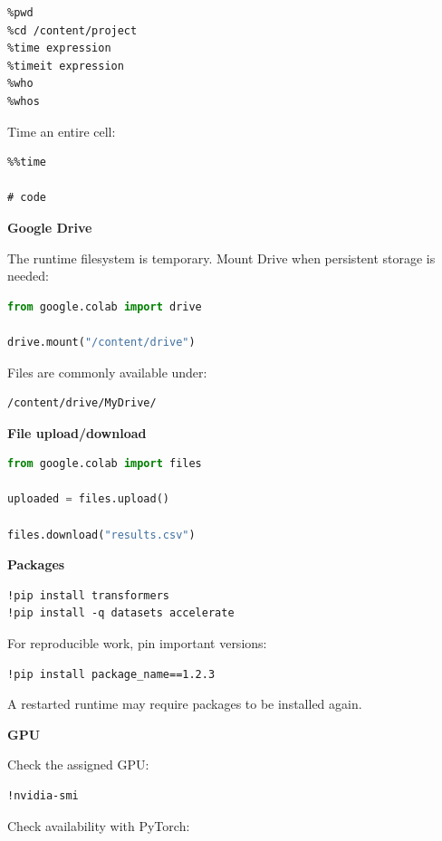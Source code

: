 \documentclass[11pt,letterpaper]{article}
\begin{document}
\begin{lstlisting}
%pwd
%cd /content/project
%time expression
%timeit expression
%who
%whos
\end{lstlisting}

Time an entire cell:

\begin{lstlisting}
%%time

# code
\end{lstlisting}

\textbf{Google Drive}

The runtime filesystem is temporary. Mount Drive when persistent storage is
needed:

\begin{lstlisting}[language=Python]
from google.colab import drive

drive.mount("/content/drive")
\end{lstlisting}

Files are commonly available under:

\begin{lstlisting}
/content/drive/MyDrive/
\end{lstlisting}

\textbf{File upload/download}

\begin{lstlisting}[language=Python]
from google.colab import files

uploaded = files.upload()

files.download("results.csv")
\end{lstlisting}

\textbf{Packages}

\begin{lstlisting}
!pip install transformers
!pip install -q datasets accelerate
\end{lstlisting}

For reproducible work, pin important versions:

\begin{lstlisting}
!pip install package_name==1.2.3
\end{lstlisting}

A restarted runtime may require packages to be installed again.

\textbf{GPU}

Check the assigned GPU:

\begin{lstlisting}
!nvidia-smi
\end{lstlisting}

Check availability with PyTorch:
\end{document}
